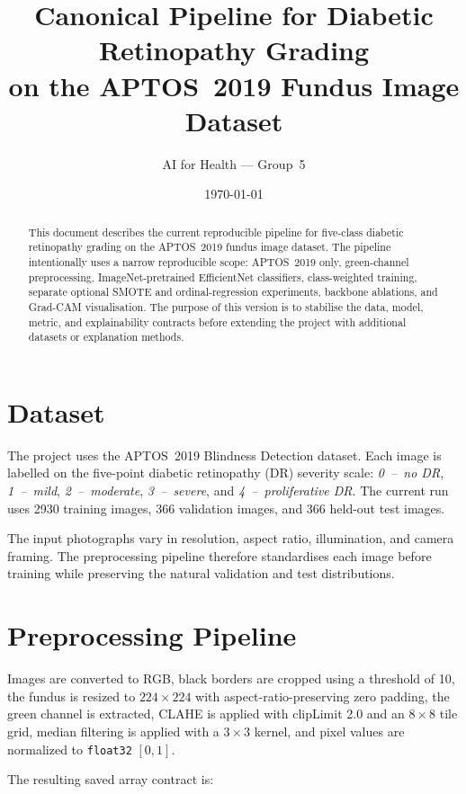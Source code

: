 \documentclass[11pt,a4paper]{article}
\title{Canonical Pipeline for Diabetic Retinopathy Grading\\
on the APTOS~2019 Fundus Image Dataset}
\author{AI for Health --- Group~5}
\date{\today}
\begin{document}
\maketitle

\begin{abstract}
This document describes the current reproducible pipeline for five-class
diabetic retinopathy grading on the APTOS~2019 fundus image dataset. The
pipeline intentionally uses a narrow reproducible scope: APTOS~2019 only,
green-channel preprocessing, ImageNet-pretrained EfficientNet classifiers,
class-weighted training, separate optional SMOTE and ordinal-regression
experiments, backbone ablations, and Grad-CAM visualisation. The purpose of
this version is to stabilise the data, model, metric, and explainability
contracts before extending the project with additional datasets or explanation
methods.
\end{abstract}

\section{Dataset}
\label{sec:dataset}

The project uses the APTOS~2019 Blindness Detection dataset. Each image is
labelled on the five-point diabetic retinopathy (DR) severity scale:
\emph{0~--~no DR}, \emph{1~--~mild}, \emph{2~--~moderate},
\emph{3~--~severe}, and \emph{4~--~proliferative DR}. The current run uses
\num{2930} training images, \num{366} validation images, and \num{366} held-out
test images.

The input photographs vary in resolution, aspect ratio, illumination, and
camera framing. The preprocessing pipeline therefore standardises each image
before training while preserving the natural validation and test distributions.

\section{Preprocessing Pipeline}
\label{sec:pipeline}

Images are converted to RGB, black borders are cropped using a threshold of 10,
the fundus is resized to \(224 \times 224\) with aspect-ratio-preserving zero
padding, the green channel is extracted, CLAHE is applied with clipLimit 2.0
and an \(8 \times 8\) tile grid, median filtering is applied with a \(3 \times 3\)
kernel, and pixel values are normalized to \texttt{float32} \([0,1]\).

The resulting saved array contract is:
\end{document}
